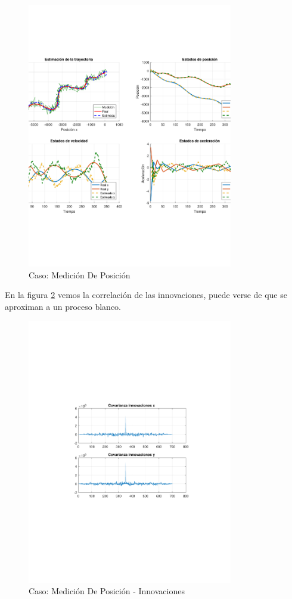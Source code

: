 		\begin{figure}[H]
			\centering
			\includegraphics[width=0.8\textwidth,keepaspectratio]{Figuras/graf_ej2a.pdf}
			\caption{Caso: Medición De Posición}
			\label{fig:ej2a}
		\end{figure}
		
		En la figura \ref{fig:ej2a_innov} vemos la correlación de las innovaciones, puede verse de que se aproximan a un proceso blanco.
		
		\begin{figure}[H]
			\centering
			\includegraphics[width=0.8\textwidth,keepaspectratio]{Figuras/covinn_ej2a.pdf}
			\caption{Caso: Medición De Posición - Innovaciones}
			\label{fig:ej2a_innov}
		\end{figure}
		
